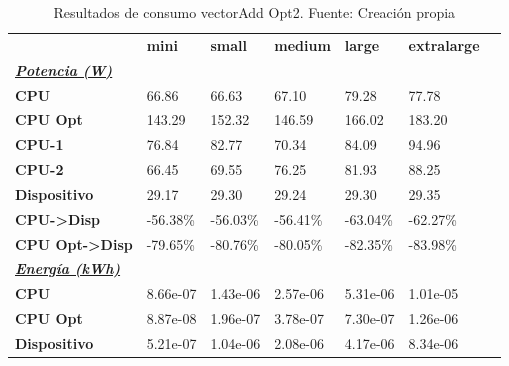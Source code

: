 \begin{table}[H]
    \centering
    \begin{tabular}{lllllll}
    \rowcolor[HTML]{DAE8FC} \ & \textbf{mini} & \textbf{small} & \textbf{medium} & \textbf{	large} & \textbf{	extralarge} \\
    \cellcolor[HTML]{DAE8FC} \textbf{\textbf{{\emph{{\underline{{Potencia (W)}}}}}}} &  &  &  & 	 & 	 \\
    \rowcolor[HTML]{EFEFEF} \cellcolor[HTML]{DAE8FC} \textbf{CPU} & 66.86 & 66.63 & 67.10 & 	79.28 & 	77.78 \\
    \cellcolor[HTML]{DAE8FC} \textbf{CPU Opt} & 143.29 & 152.32 & 146.59 & 	166.02 & 	183.20 \\
    \rowcolor[HTML]{EFEFEF} \cellcolor[HTML]{DAE8FC} \textbf{\quad CPU-1} & 76.84 & 82.77 & 70.34 & 	84.09 & 	94.96 \\
    \cellcolor[HTML]{DAE8FC} \textbf{\quad CPU-2} & 66.45 & 69.55 & 76.25 & 	81.93 & 	88.25 \\
    \rowcolor[HTML]{EFEFEF} \cellcolor[HTML]{DAE8FC} \textbf{Dispositivo} & 29.17 & 29.30 & 29.24 & 	29.30 & 	29.35 \\
    \cellcolor[HTML]{DAE8FC} \textbf{CPU->Disp} & -56.38\% & -56.03\% & -56.41\% & 	-63.04\% & 	-62.27\% \\
    \rowcolor[HTML]{EFEFEF} \cellcolor[HTML]{DAE8FC} \textbf{CPU Opt->Disp} & -79.65\% & -80.76\% & -80.05\% & 	-82.35\% & 	-83.98\% \\
    \cellcolor[HTML]{DAE8FC} \textbf{\textbf{{\emph{{\underline{{Energía (kWh)}}}}}}} &  &  &  & 	 & 	 \\
    \rowcolor[HTML]{EFEFEF} \cellcolor[HTML]{DAE8FC} \textbf{CPU} & 8.66e-07 & 1.43e-06 & 2.57e-06 & 	5.31e-06 & 	1.01e-05 \\
    \cellcolor[HTML]{DAE8FC} \textbf{CPU Opt} & 8.87e-08 & 1.96e-07 & 3.78e-07 & 	7.30e-07 & 	1.26e-06 \\
    \rowcolor[HTML]{EFEFEF} \cellcolor[HTML]{DAE8FC} \textbf{Dispositivo} & 5.21e-07 & 1.04e-06 & 2.08e-06 & 	4.17e-06 & 	8.34e-06 \\
    \end{tabular}
    \caption[Resultados de consumo vectorAdd Opt2]{{Resultados de consumo vectorAdd Opt2. Fuente: Creación propia}}
    \label{table_test_vectorAdd_Opt2_hw_powerResults}
\end{table}